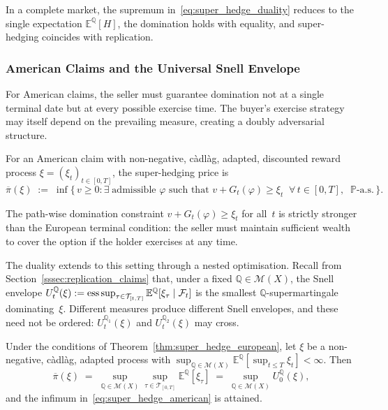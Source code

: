 In a complete market, the supremum in~\eqref{eq:super_hedge_duality}
reduces to the single expectation $\mathbb{E}^{\mathbb{Q}}[H]$, the
domination holds with equality, and super-hedging coincides with
replication.


\subsubsection{American Claims and the Universal Snell Envelope}
\label{sssec:american_incomplete}

For American claims, the seller must guarantee domination not at a single
terminal date but at every possible exercise time.  The buyer's exercise
strategy may itself depend on the prevailing measure, creating a doubly
adversarial structure.

\begin{definition}
\label{def:super_hedge_price_american}
For an American claim with non-negative, c\`{a}dl\`{a}g, adapted,
discounted reward process $\xi = (\xi_t)_{t \in [0,T]}$, the
super-hedging price is
\begin{equation}
\label{eq:super_hedge_american}
\overline{\pi}(\xi)
\;:=\; \inf\bigl\{\,v \ge 0 :
\exists\;\text{admissible } \varphi \text{ such that }
v + G_t(\varphi) \ge \xi_t \;\;\forall\, t \in [0,T],\;\;
\mathbb{P}\text{-a.s.}\,\bigr\}.
\end{equation}
\end{definition}

The path-wise domination constraint $v + G_t(\varphi) \ge \xi_t$ for
all~$t$ is strictly stronger than the European terminal condition: the
seller must maintain sufficient wealth to cover the option if the holder
exercises at any time.

The duality extends to this setting through a nested optimisation.
Recall from Section~\ref{sssec:replication_claims} that, under a fixed
$\mathbb{Q} \in \mathcal{M}(X)$, the Snell envelope
$U^{\mathbb{Q}}_t(\xi) := \operatorname*{ess\,sup}_{\tau \in \mathcal{T}_{[t,T]}}
\mathbb{E}^{\mathbb{Q}}[\xi_\tau \mid \mathcal{F}_t]$ is the smallest
$\mathbb{Q}$-supermartingale dominating~$\xi$.  Different measures
produce different Snell envelopes, and these need not be ordered:
$U^{\mathbb{Q}_1}_t(\xi)$ and $U^{\mathbb{Q}_2}_t(\xi)$ may cross.

\begin{theorem}
\label{thm:super_hedge_american}
Under the conditions of Theorem~\ref{thm:super_hedge_european}, let
$\xi$ be a non-negative, c\`{a}dl\`{a}g, adapted process with
$\sup_{\mathbb{Q} \in \mathcal{M}(X)}
\mathbb{E}^{\mathbb{Q}}[\sup_{t \le T} \xi_t] < \infty$.  Then
\begin{equation}
\label{eq:super_hedge_american_duality}
\overline{\pi}(\xi)
\;=\;
\sup_{\mathbb{Q} \in \mathcal{M}(X)}
\sup_{\tau \in \mathcal{T}_{[0,T]}}
  \mathbb{E}^{\mathbb{Q}}[\xi_\tau]
\;=\;
\sup_{\mathbb{Q} \in \mathcal{M}(X)}
  U^{\mathbb{Q}}_0(\xi),
\end{equation}
and the infimum in~\eqref{eq:super_hedge_american} is attained.
\end{theorem}

